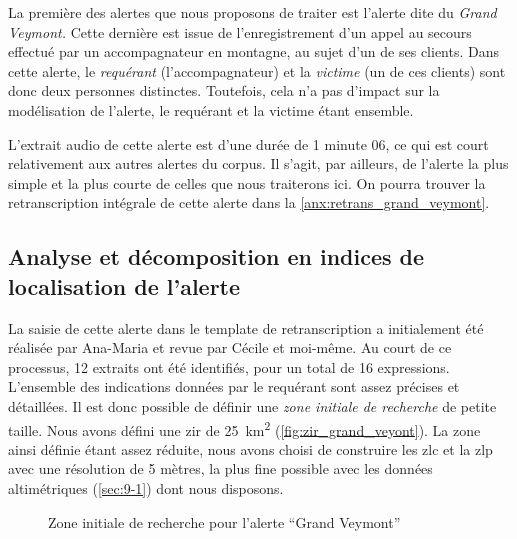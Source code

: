 La première des alertes que nous proposons de traiter est l'alerte
dite du \emph{Grand Veymont.} Cette dernière est issue de
l'enregistrement d'un appel au secours effectué par un accompagnateur
en montagne, au sujet d'un de ses clients. Dans cette alerte, le
\emph{requérant} (\ie l'accompagnateur) et la \emph{victime} (\ie un
de ces clients) sont donc deux personnes distinctes. Toutefois, cela
n'a pas d'impact sur la modélisation de l'alerte, le requérant et la
victime étant ensemble.

L'extrait audio de cette alerte est d'une durée de 1 minute 06, ce qui
est court relativement aux autres alertes du corpus. Il s'agit, par
ailleurs, de l'alerte la plus simple et la plus courte de celles que
nous traiterons ici. On pourra trouver la retranscription intégrale de
cette alerte dans la \autoref{anx:retrans_grand_veymont}.

\subsection{Analyse et décomposition en indices de localisation de
  l'alerte}
\label{subsec:9-2-1}

La saisie de cette alerte dans le template de retranscription a
initialement été réalisée par Ana-Maria  et revue
par Cécile  et moi-même. Au court de ce processus, 12
extraits ont été identifiés, pour un total de 16
expressions. L'ensemble des indications données par le requérant sont
assez précises et détaillées. Il est donc possible de définir une
\emph{zone initiale de recherche} de petite taille. Nous avons défini
une \ac{zir} de \SI{25}{\kilo\meter\squared}
(\autoref{fig:zir_grand_veyont}). La zone ainsi définie étant assez
réduite, nous avons choisi de construire les \ac{zlc} et la \ac{zlp}
avec une résolution de 5 mètres, la plus fine possible avec les
données altimétriques (\autoref{sec:9-1}) dont nous disposons.

\begin{figure}
  \centering
  
  \caption{Zone initiale de recherche pour l'alerte \enquote{Grand
      Veymont}}
  \label{fig:zir_grand_veyont}
\end{figure}

